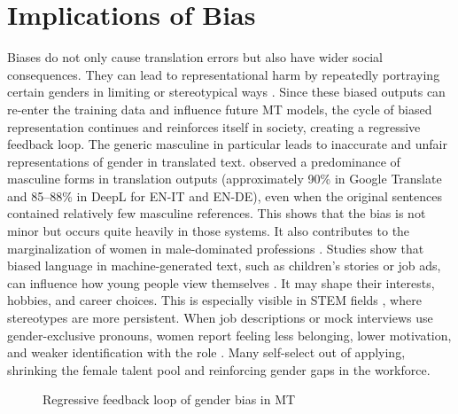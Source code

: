     \section{Implications of Bias}
        Biases do not only cause translation errors but also have wider social consequences. They can lead to representational harm by repeatedly portraying certain genders in limiting or stereotypical ways \parencite{stanczakSurveyGenderBias2021}. Since these biased outputs can re-enter the training data and influence future MT models, the cycle of biased representation continues and reinforces itself in society, creating a regressive feedback loop. The generic masculine in particular leads to inaccurate and unfair representations of gender in translated text. \textcite{rescignoGenderBiasMachine2023} observed a predominance of masculine forms in translation outputs (approximately 90\% in Google Translate and 85–88\% in DeepL for EN-IT and EN-DE), even when the original sentences contained relatively few masculine references. This shows that the bias is not minor but occurs quite heavily in those systems. It also contributes to the marginalization of women in male-dominated professions \parencite{kapplAreAllSpanish2025}. Studies show that biased language in machine-generated text, such as children’s stories or job ads, can influence how young people view themselves \parencite{soundararajanInvestigatingGenderBias2024,kapplAreAllSpanish2025}. It may shape their interests, hobbies, and career choices. This is especially visible in STEM fields \parencite{pratesAssessingGenderBias2019}, where stereotypes are more persistent. When job descriptions or mock interviews use gender-exclusive pronouns, women report feeling less belonging, lower motivation, and weaker identification with the role \parencite{godsilEffectsGenderRoles2016}. Many self-select out of applying, shrinking the female talent pool and reinforcing gender gaps in the workforce.


        \vspace{0.8em} 
        \begin{figure}[htb]
            \centering
            \scalebox{0.8}{}
            \caption{Regressive feedback loop of gender bias in MT}
            \label{fig:regressive_feedback_loop}
        \end{figure}
        \vspace{0.8em} 


